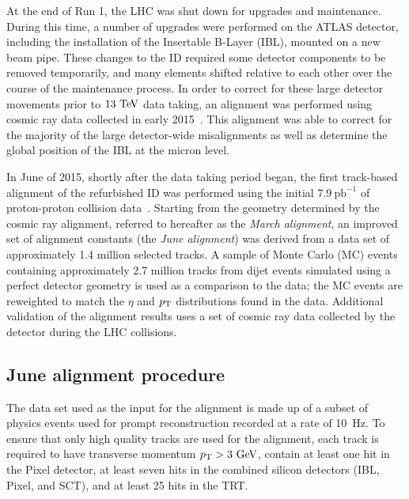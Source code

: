 At the end of Run 1, the LHC was shut down for upgrades and maintenance.
During this time, a number of upgrades were performed on the ATLAS detector, including the installation of the Insertable B-Layer (IBL), mounted on a new beam pipe.
These changes to the ID required some detector components to be removed temporarily, and many elements shifted relative to each other over the course of the maintenance process.
In order to correct for these large detector movements prior to $13\tev$ data taking, an alignment was performed using cosmic ray data collected in early 2015~\cite{2015.alignment-2015-cosmic}.
This alignment was able to correct for the majority of the large detector-wide misalignments as well as determine the global position of the IBL at the micron level.

In June of 2015, shortly after the data taking period began, the first track-based alignment of the refurbished ID was performed using the initial $7.9~\mathrm{pb}^{-1}$ of  proton-proton collision data~\cite{2015.alignment-13tev}.
Starting from the geometry determined by the cosmic ray alignment, referred to hereafter as the \emph{March alignment}, an improved set of alignment constants (the \emph{June alignment}) was derived from a data set of approximately 1.4 million selected tracks.
A sample of Monte Carlo (MC) events containing approximately 2.7 million tracks from dijet events simulated using a perfect detector geometry is used as a comparison to the data; the MC events are reweighted to match the $\eta$ and $p_{\mathrm{T}}$ distributions found in the data.
Additional validation of the alignment results uses a set of cosmic ray data collected by the detector during the LHC collisions.

\subsection{June alignment procedure}
The data set used as the input for the alignment is made up of a subset of physics events used for prompt reconstruction recorded at a rate of 10~Hz.
To ensure that only high quality tracks are used for the alignment, each track is required to have transverse momentum $\pt > 3\gev$, contain at least one hit in the Pixel detector, at least seven hits in the combined silicon detectors (IBL, Pixel, and SCT), and at least 25 hits in the TRT.


